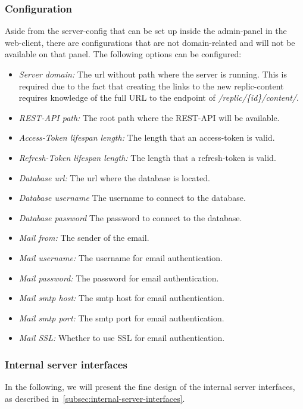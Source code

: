 \subsubsection{Configuration}
Aside from the server-config that can be set up inside the admin-panel in the web-client, there are configurations that are not domain-related and will not be available on that panel.
The following options can be configured:
\begin{itemize}
    \item \textit{Server domain:} The url without path where the server is running.
    This is required due to the fact that creating the links to the new replic-content requires knowledge of the full URL to the endpoint of \textit{/replic/\{id\}/content/}.
    \item \textit{REST-API path:} The root path where the REST-API will be available.
    \item \textit{Access-Token lifespan length:} The length that an access-token is valid.
    \item \textit{Refresh-Token lifespan length:} The length that a refresh-token is valid.
    \item \textit{Database url:} The url where the database is located.
    \item \textit{Database username} The username to connect to the database.
    \item \textit{Database password} The password to connect to the database.
    \item \textit{Mail from:} The sender of the email.
    \item \textit{Mail username:} The username for email authentication.
    \item \textit{Mail password:} The password for email authentication.
    \item \textit{Mail smtp host:} The smtp host for email authentication.
    \item \textit{Mail smtp port:} The smtp port for email authentication.
    \item \textit{Mail SSL:} Whether to use SSL for email authentication.
\end{itemize}

\subsubsection{Internal server interfaces}
In the following, we will present the fine design of the internal server interfaces, as described in~\ref{subsec:internal-server-interfaces}.

